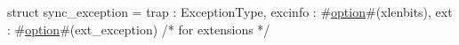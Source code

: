 struct sync_exception = {
  trap    : ExceptionType,
  excinfo : #\hyperref[sailRISCVzoption]{option}#(xlenbits),
  ext     : #\hyperref[sailRISCVzoption]{option}#(ext_exception)   /* for extensions */
}
